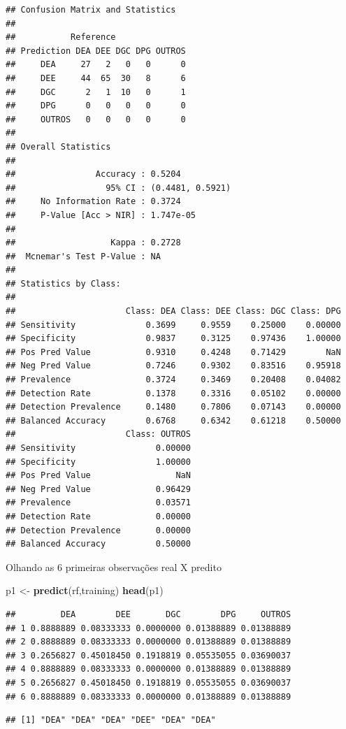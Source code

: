 \documentclass[]{article}
\newenvironment{Shaded}{\begin{snugshade}}{\end{snugshade}}
\newcommand{\KeywordTok}[1]{\textcolor[rgb]{0.13,0.29,0.53}{\textbf{#1}}}
\newcommand{\StringTok}[1]{\textcolor[rgb]{0.31,0.60,0.02}{#1}}
\newcommand{\OperatorTok}[1]{\textcolor[rgb]{0.81,0.36,0.00}{\textbf{#1}}}
\newcommand{\NormalTok}[1]{#1}
\begin{document}
\begin{verbatim}
## Confusion Matrix and Statistics
## 
##           Reference
## Prediction DEA DEE DGC DPG OUTROS
##     DEA     27   2   0   0      0
##     DEE     44  65  30   8      6
##     DGC      2   1  10   0      1
##     DPG      0   0   0   0      0
##     OUTROS   0   0   0   0      0
## 
## Overall Statistics
##                                           
##                Accuracy : 0.5204          
##                  95% CI : (0.4481, 0.5921)
##     No Information Rate : 0.3724          
##     P-Value [Acc > NIR] : 1.747e-05       
##                                           
##                   Kappa : 0.2728          
##  Mcnemar's Test P-Value : NA              
## 
## Statistics by Class:
## 
##                      Class: DEA Class: DEE Class: DGC Class: DPG
## Sensitivity              0.3699     0.9559    0.25000    0.00000
## Specificity              0.9837     0.3125    0.97436    1.00000
## Pos Pred Value           0.9310     0.4248    0.71429        NaN
## Neg Pred Value           0.7246     0.9302    0.83516    0.95918
## Prevalence               0.3724     0.3469    0.20408    0.04082
## Detection Rate           0.1378     0.3316    0.05102    0.00000
## Detection Prevalence     0.1480     0.7806    0.07143    0.00000
## Balanced Accuracy        0.6768     0.6342    0.61218    0.50000
##                      Class: OUTROS
## Sensitivity                0.00000
## Specificity                1.00000
## Pos Pred Value                 NaN
## Neg Pred Value             0.96429
## Prevalence                 0.03571
## Detection Rate             0.00000
## Detection Prevalence       0.00000
## Balanced Accuracy          0.50000
\end{verbatim}

Olhando as 6 primeiras observações real X predito

\begin{Shaded}
\begin{Highlighting}[]
\NormalTok{p1 <-}\StringTok{ }\KeywordTok{predict}\NormalTok{(rf,training)}
\KeywordTok{head}\NormalTok{(p1)}
\end{Highlighting}
\end{Shaded}

\begin{verbatim}
##         DEA        DEE       DGC        DPG     OUTROS
## 1 0.8888889 0.08333333 0.0000000 0.01388889 0.01388889
## 2 0.8888889 0.08333333 0.0000000 0.01388889 0.01388889
## 3 0.2656827 0.45018450 0.1918819 0.05535055 0.03690037
## 4 0.8888889 0.08333333 0.0000000 0.01388889 0.01388889
## 5 0.2656827 0.45018450 0.1918819 0.05535055 0.03690037
## 6 0.8888889 0.08333333 0.0000000 0.01388889 0.01388889
\end{verbatim}

\begin{Shaded}
\end{Shaded}

\begin{verbatim}
## [1] "DEA" "DEA" "DEA" "DEE" "DEA" "DEA"
\end{verbatim}
\end{document}

